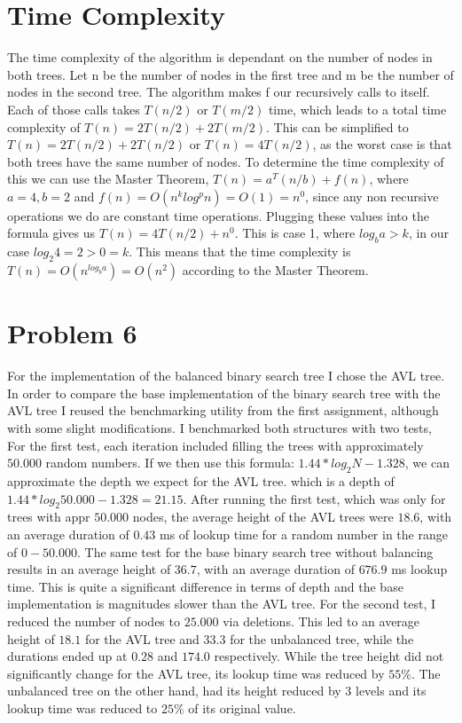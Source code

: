 \documentclass{article}
\begin{document}
\section{Time Complexity}

The time complexity of the algorithm is dependant on the number of nodes
in both trees. Let n be the number of nodes in the ﬁrst tree and m be the
number of nodes in the second tree. The algorithm makes f our recursively calls
to itself. Each of those calls takes $T(n/2)$ or $T(m/2)$ time, which leads to a
total time complexity of $T(n) = 2T(n/2) + 2T(m/2)$. This can be simpliﬁed to
$T(n) = 2T(n/2) + 2T(n/2)$ or $T(n) = 4T(n/2)$, as the worst case is that both
trees have the same number of nodes.
To determine the time complexity of this we can use the Master Theorem,
$T(n) = a^T(n/b)+ f(n)$, where $a = 4, b = 2$ and $f(n) = O(n^k log^p n) = O(1) = n^0$,
since any non recursive operations we do are constant time operations. Plugging
these values into the formula gives us $T(n) = 4T(n/2)+n^0$. This is case 1, where
$log_b a > k$, in our case $log_2 4 = 2 > 0 = k$. This means that the time complexity
is $T(n) = O(n^{log_b a}) = O(n^2)$ according to the Master Theorem.

\section{Problem 6}

For the implementation of the balanced binary search tree I chose the AVL tree.
In order to compare the base implementation of the binary search tree with the
AVL tree I reused the benchmarking utility from the ﬁrst assignment, although
with some slight modiﬁcations. I benchmarked both structures with two tests,
For the ﬁrst test, each iteration included ﬁlling the trees with approximately
$50.000$ random numbers. If we then use this formula: $1.44 * log_2 N - 1.328$, we 
can approximate the depth we expect for the AVL tree. which is a depth of
$1.44 * log_2 50.000 - 1.328 = 21.15$.  After running the ﬁrst test, which was only
for trees with appr $50.000$ nodes, the average height of the AVL trees were $18.6$,
with an average duration of $0.43$ ms of lookup time for a random number in
the range of $0 - 50.000$. The same test for the base binary search tree without
balancing results in an average height of $36.7$, with an average duration of $676.9$
ms lookup time. This is quite a signiﬁcant diﬀerence in terms of depth and the
base implementation is magnitudes slower than the AVL tree.
For the second test, I reduced the number of nodes to $25.000$ via deletions.
This led to an average height of $18.1$ for the AVL tree and $33.3$ for the unbalanced
tree, while the durations ended up at $0.28$ and $174.0$ respectively. While the
tree height did not signiﬁcantly change for the AVL tree, its lookup time was
reduced by $55\%$. The unbalanced tree on the other hand, had its height reduced
by 3 levels and its lookup time was reduced to $25\%$ of its original value.
\end{document}
